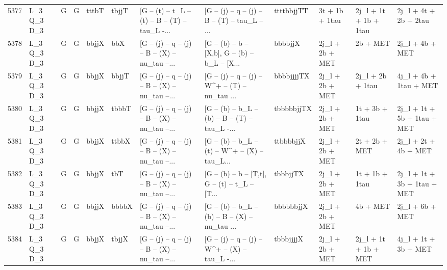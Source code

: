 \begin{tabular}{llllllllllll}
5377 &  L\_3 Q\_3 D\_3 &     G &     G &       tttbT &       tbjjT &  [G -- (t) -- t\_L -- (t) -- B -- (T) -- tau\_L -... &  [G -- (j) -- q -- (j) -- B -- (T) -- tau\_L -- ... &  ttttbbjjTT &           3t + 1b + 1tau &    2j\_l + 1t + 1b + 1tau &              2j\_l + 4t + 2b + 2tau \\
5378 &  L\_3 Q\_3 D\_3 &     G &     G &       bbjjX &         bbX &  [G -- (j) -- q -- (j) -- B -- (X) -- nu\_tau --... &  [G -- (b) -- b -- [X,b], G -- (b) -- b\_L -- [X... &     bbbbjjX &          2j\_l + 2b + MET &                 2b + MET &                    2j\_l + 4b + MET \\
5379 &  L\_3 Q\_3 D\_3 &     G &     G &       bbjjX &       bbjjT &  [G -- (j) -- q -- (j) -- B -- (X) -- nu\_tau --... &  [G -- (j) -- q -- (j) -- W\textasciicircum + -- (T) -- nu\_tau ... &  bbbbjjjjTX &          2j\_l + 2b + MET &         2j\_l + 2b + 1tau &             4j\_l + 4b + 1tau + MET \\
5380 &  L\_3 Q\_3 D\_3 &     G &     G &       bbjjX &       tbbbT &  [G -- (j) -- q -- (j) -- B -- (X) -- nu\_tau --... &  [G -- (b) -- b\_L -- (b) -- B -- (T) -- tau\_L -... &  tbbbbbjjTX &          2j\_l + 2b + MET &           1t + 3b + 1tau &        2j\_l + 1t + 5b + 1tau + MET \\
5381 &  L\_3 Q\_3 D\_3 &     G &     G &       bbjjX &       ttbbX &  [G -- (j) -- q -- (j) -- B -- (X) -- nu\_tau --... &  [G -- (b) -- b\_L -- (t) -- W\textasciicircum + -- (X) -- tau\_L... &   ttbbbbjjX &          2j\_l + 2b + MET &            2t + 2b + MET &               2j\_l + 2t + 4b + MET \\
5382 &  L\_3 Q\_3 D\_3 &     G &     G &       bbjjX &         tbT &  [G -- (j) -- q -- (j) -- B -- (X) -- nu\_tau --... &  [G -- (b) -- b -- [T,t], G -- (t) -- t\_L -- [T... &    tbbbjjTX &          2j\_l + 2b + MET &           1t + 1b + 1tau &        2j\_l + 1t + 3b + 1tau + MET \\
5383 &  L\_3 Q\_3 D\_3 &     G &     G &       bbjjX &       bbbbX &  [G -- (j) -- q -- (j) -- B -- (X) -- nu\_tau --... &  [G -- (b) -- b\_L -- (b) -- B -- (X) -- nu\_tau ... &   bbbbbbjjX &          2j\_l + 2b + MET &                 4b + MET &                    2j\_l + 6b + MET \\
5384 &  L\_3 Q\_3 D\_3 &     G &     G &       bbjjX &       tbjjX &  [G -- (j) -- q -- (j) -- B -- (X) -- nu\_tau --... &  [G -- (j) -- q -- (j) -- W\textasciicircum + -- (X) -- tau\_L -... &   tbbbjjjjX &          2j\_l + 2b + MET &     2j\_l + 1t + 1b + MET &               4j\_l + 1t + 3b + MET \\

\end{tabular}
